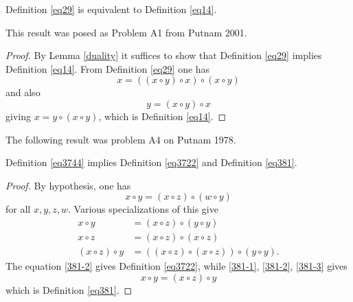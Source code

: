 \begin{theorem}[29 equivalent to 14]\label{29_equiv_14} \leanok  Definition \ref{eq29} is equivalent to Definition \ref{eq14}.
\end{theorem}

This result was posed as  Problem A1 from Putnam 2001.

\begin{proof}\leanok{} By Lemma \ref{duality} it suffices to show that Definition \ref{eq29} implies Definition \ref{eq14}.  From Definition \ref{eq29} one has
  $$ x = ((x \circ y) \circ x) \circ (x \circ y)$$
  and also
  $$ y = (x \circ y) \circ x$$
  giving $x = y \circ (x \circ y)$, which is Definition \ref{eq14}.
\end{proof}



The following result was problem A4 on Putnam 1978.

\begin{theorem}[3744 implies 3722, 381]\label{3744_implies_3722_381} Definition \ref{eq3744} implies Definition \ref{eq3722} and Definition \ref{eq381}.
\end{theorem}

\begin{proof} By hypothesis, one has
$$x \circ y = (x \circ z) \circ (w \circ y)
  $$
for all $x,y,z,w$.  Various specializations of this give
\begin{align}
 x \circ y &= (x \circ z) \circ (y \circ y) \label{381-1} \\
 x \circ z &= (x \circ z) \circ (x \circ z) \label{381-2} \\
(x \circ z) \circ y &= ((x \circ z) \circ (x \circ z)) \circ (y \circ y) \label{381-3}.
\end{align}
The equation \eqref{381-2} gives Definition \ref{eq3722}, while \eqref{381-1}, \eqref{381-2}, \eqref{381-3} gives
$$ x \circ y = (x\circ z) \circ y$$
which is Definition \ref{eq381}.
\end{proof}
